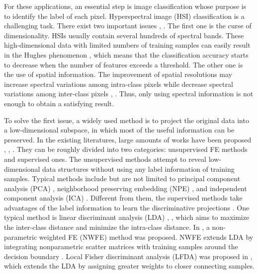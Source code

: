 \documentclass[12pt,onecolumn]{IEEEtran}
\begin{document}
\begin{spacing}{2}
For these applications, an essential step is image classification whose purpose is to identify the label of each pixel. Hyperspectral image (HSI) classification is a challenging task. There exist two important issues \cite{Zhao2016Spectral}, \cite{Hang2015Matrix}. The first one is the curse of dimensionality. HSIs usually contain several hundreds of spectral bands. These high-dimensional data with limited numbers of training samples can easily result in the Hughes phenomenon \cite{Hughes1968On}, which means that the classification accuracy starts to decrease when the number of features exceeds a threshold. The other one is the use of spatial information. The improvement of spatial resolutions may increase spectral variations among intra-class pixels while decrease spectral variations among inter-class pixels \cite{Zhang2012On}, \cite{Xu2014Patch}. Thus, only using spectral information is not enough to obtain a satisfying result.

To solve the first issue, a widely used method is to project the original data into a low-dimensional subspace, in which most of the useful information can be preserved. In the existing literatures, large amounts of works have been proposed \cite{Palsson2015Model}, \cite{Kuo2005Nonparametric}, \cite{Chen2005Local}. They can be roughly divided into two categories: unsupervised FE methods and supervised ones. The unsupervised methods attempt to reveal low-dimensional data structures without using any label information of training samples. Typical methods include but are not limited to principal component analysis (PCA) \cite{Palsson2015Model}, neighborhood preserving embedding (NPE) \cite{He2005Neighborhood}, and independent component analysis (ICA) \cite{Villa2011Hyperspectral}. Different from them, the supervised methods take advantages of the label information to learn the discriminative projections \cite{Zhou2015Dimension}. One typical method is linear discriminant analysis (LDA) \cite{Friedman1989Regularized}, \cite{Bandos2009Classification}, which aims to maximize the inter-class distance and minimize the intra-class distance. In \cite{Kuo2005Nonparametric}, a non-parametric weighted FE (NWFE) method was proposed. NWFE extends LDA by integrating nonparametric scatter matrices with training samples around the decision boundary \cite{Kuo2005Nonparametric}. Local Fisher discriminant analysis (LFDA) was proposed in \cite{Sugiyama2007Dimensionality}, which extends the LDA by assigning greater weights to closer connecting samples.


\end{spacing}
\end{document}
